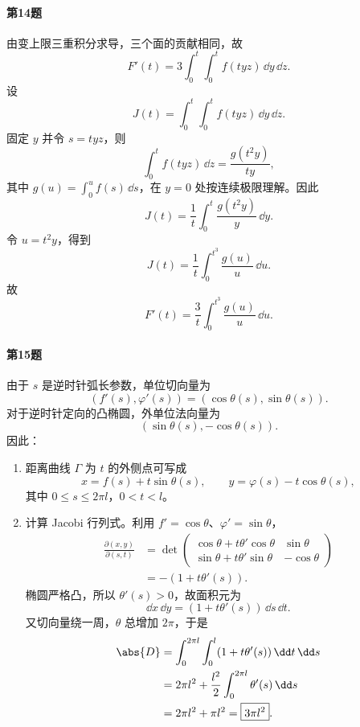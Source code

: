 \paragraph{第14题}
\begin{xsolution}
由变上限三重积分求导，三个面的贡献相同，故
\[
  F'(t)=3\int_0^t\int_0^t f(tyz)\,\dd y\,\dd z.
\]
设
\[
  J(t)=\int_0^t\int_0^t f(tyz)\,\dd y\,\dd z.
\]
固定 $y$ 并令 $s=tyz$，则
\[
  \int_0^tf(tyz)\,\dd z
  =\frac{g(t^2y)}{ty},
\]
其中 $g(u)=\int_0^uf(s)\,\dd s$，在 $y=0$ 处按连续极限理解。因此
\[
  J(t)=\frac1t\int_0^t\frac{g(t^2y)}y\,\dd y.
\]
令 $u=t^2y$，得到
\[
  J(t)=\frac1t\int_0^{t^3}\frac{g(u)}u\,\dd u.
\]
故
\[
  \boxed{F'(t)=\frac3t\int_0^{t^3}\frac{g(u)}u\,\dd u}.
\]
\end{xsolution}

\paragraph{第15题}
\begin{xsolution}
由于 $s$ 是逆时针弧长参数，单位切向量为
\[
  (f'(s),\varphi'(s))=(\cos\theta(s),\sin\theta(s)).
\]
对于逆时针定向的凸椭圆，外单位法向量为
\[
  (\sin\theta(s),-\cos\theta(s)).
\]
因此：
\begin{enumerate}[label=(\arabic*)]
  \item 距离曲线 $\Gamma$ 为 $t$ 的外侧点可写成
  \[
    \boxed{
    x=f(s)+t\sin\theta(s),
    \qquad
    y=\varphi(s)-t\cos\theta(s)},
  \]
  其中 $0\le s\le2\pi l$，$0<t<l$。

  \item 计算 Jacobi 行列式。利用 $f'=\cos\theta$、$\varphi'=\sin\theta$，
  \begin{align*}
    \frac{\partial(x,y)}{\partial(s,t)}
    &=\det
    \begin{pmatrix}
      \cos\theta+t\theta'\cos\theta&\sin\theta\\
      \sin\theta+t\theta'\sin\theta&-\cos\theta
    \end{pmatrix}\\
    &=-(1+t\theta'(s)).
  \end{align*}
  椭圆严格凸，所以 $\theta'(s)>0$，故面积元为
  \[
    \dd x\,\dd y=(1+t\theta'(s))\,\dd s\,\dd t.
  \]
  又切向量绕一周，$\theta$ 总增加 $2\pi$，于是
  \begin{align*}
    \abs{D}
    &=\int_0^{2\pi l}\int_0^l(1+t\theta'(s))\,\dd t\,\dd s\\
    &=2\pi l^2+\frac{l^2}{2}\int_0^{2\pi l}\theta'(s)\,\dd s\\
    &=2\pi l^2+\pi l^2
    =\boxed{3\pi l^2}.
  \end{align*}
\end{enumerate}
\end{xsolution}

